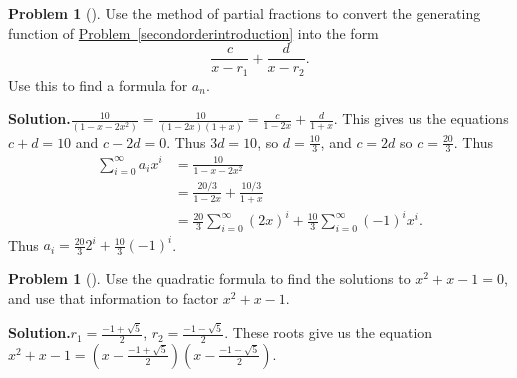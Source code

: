 \documentclass[10pt,]{book}
\theoremstyle{plain}
\theoremstyle{definition}
\newtheorem{activity}[project]{Problem}
\theoremstyle{definition}
\numberwithin{equation}{chapter}
\newcommand{\amp}{&}
\begin{document}
\begin{activity}[]\label{activity-219}
Use the method of partial fractions to convert the generating function of \hyperref[secondorderintroduction]{Problem~\ref{secondorderintroduction}} into the form%
\begin{equation*}
\frac{c}{x-r_1} + \frac{d}{x-r_2}\text{.}
\end{equation*}
Use this to find a formula for \(a_n\).%
\par\medskip\noindent%
\textbf{Solution.}\quad \(\frac{10}{(1-x-2x^2)}=\frac{10}{(1-2x)(1+x)} = \frac{c}{1-2x} +\frac{d}{1+x}\). This gives us the equations \(c+d=10\) and \(c-2d=0\). Thus \(3d=10\), so \(d=\frac{10}{3}\), and \(c=2d\) so \(c=\frac{20}{3}\). Thus%
\begin{align*}
\sum_{i=0}^\infty a_ix^i  \amp=  \frac{10}{1-x-2x^2}\\
\amp= \frac{20/3}{1-2x} + \frac{10/3}{1+x}\\
\amp= \frac{20}{3}\sum_{i=0}^\infty (2x)^i + \frac{10}{3}\sum_{i=0}^\infty (-1)^ix^i\text{.}
\end{align*}
Thus \(a_i=\frac{20}{3}2^i +\frac{10}{3}(-1)^i\).%
\end{activity}
\begin{activity}[]\label{factorFibonacci}
Use the quadratic formula to find the solutions to \(x^2+x-1=0\), and use that information to factor \(x^2+x-1\).%
\par\medskip\noindent%
\textbf{Solution.}\quad \(r_1=\frac{-1+\sqrt{5}}{2}\), \(r_2 = \frac{-1-\sqrt{5}}{2}\). These roots give us the equation \(x^2+x-1=(x-\frac{-1+\sqrt{5}}{2})(x-\frac{-1-\sqrt{5}}{2})\).%
\end{activity}
\end{document}
